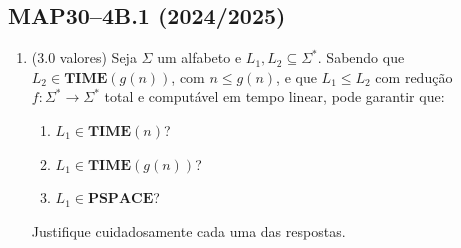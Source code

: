 \documentclass[a4paper,12pt]{article}
\begin{document}
\vspace{1.0cm}
\subsection*{MAP30–4B.1 (2024/2025)}
\begin{enumerate}[label=\alph*)]
  \item (3.0 valores) Seja \(\Sigma\) um alfabeto e \(L_1, L_2 \subseteq \Sigma^*\). Sabendo que \(L_2 \in \textbf{TIME}(g(n))\), com \(n \leq g(n)\), e que \(L_1 \leq L_2\) com redução \(f : \Sigma^* \to \Sigma^*\) total e computável em tempo linear, pode garantir que:
  
  \begin{enumerate}[label=(\roman*)]
      \item \(L_1 \in \textbf{TIME}(n)\)?
      \item \(L_1 \in \textbf{TIME}(g(n))\)?
      \item \(L_1 \in \textbf{PSPACE}\)?
  \end{enumerate}
  
  Justifique cuidadosamente cada uma das respostas.
\end{enumerate}
\end{document}
